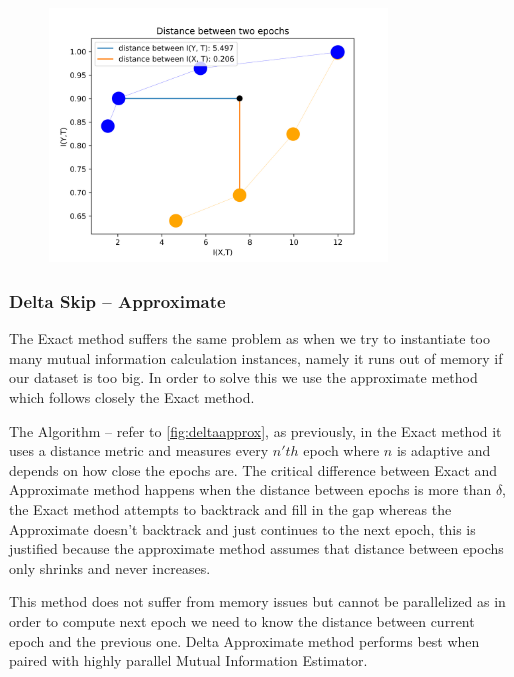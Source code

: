 \documentclass[dissertation.tex]{subfiles}
\begin{document}
  \begin{figure}[H]
    \centering
    \includegraphics[width=0.80\textwidth]{figs/ip_pair.png}
    \label{fig:ip_pair}
  \end{figure}

\subsubsection{Delta Skip -- Approximate}

  The Exact method suffers the same problem as when we try to instantiate too
  many mutual information calculation instances, namely it runs out of memory if
  our dataset is too big. In order to solve this we use the approximate method
  which follows closely the Exact method. 

  The Algorithm -- refer to \autoref{fig:deltaapprox}, as previously, in the
  Exact method it uses a distance metric and measures every $n'th$ epoch where
  $n$ is adaptive and depends on how close the epochs are. The critical
  difference between Exact and Approximate method happens when the distance
  between epochs is more than $\delta$, the Exact method attempts to backtrack
  and fill in the gap whereas the Approximate doesn't backtrack and just
  continues to the next epoch, this is justified because the approximate method
  assumes that distance between epochs only shrinks and never increases.

  This method does not suffer from memory issues but cannot be parallelized as
  in order to compute next epoch we need to know the distance between current
  epoch and the previous one. Delta Approximate method performs best when paired
  with highly parallel Mutual Information Estimator.
\end{document}
